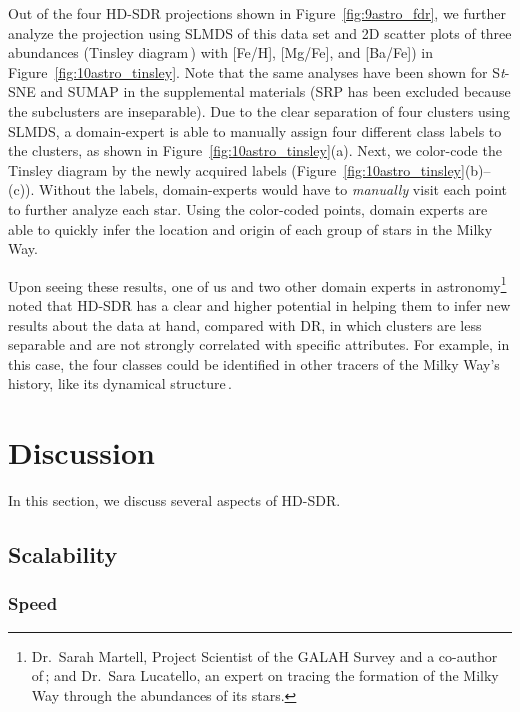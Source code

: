 \documentclass[sagev,Afour,times]{sagej}
\begin{document}
Out of the four HD-SDR projections shown in Figure~\ref{fig:9astro_fdr}, we further analyze the projection using SLMDS of this data set and 2D scatter plots of three abundances (Tinsley diagram\,\cite{Tinsley80}) with [Fe/H], [Mg/Fe], and [Ba/Fe]) in Figure~\ref{fig:10astro_tinsley}. Note that the same analyses have been shown for S\emph{t}-SNE and SUMAP in the supplemental materials (SRP has been excluded because the subclusters are inseparable). Due to the clear separation of four clusters using SLMDS, a domain-expert is able to manually assign four different class labels to the clusters, as shown in Figure~\ref{fig:10astro_tinsley}(a). Next, we color-code the Tinsley diagram by the newly acquired labels (Figure~\ref{fig:10astro_tinsley}(b)--(c)). Without the labels, domain-experts would have to \emph{manually} visit each point to further analyze each star. Using the color-coded points, domain experts are able to quickly infer the location and origin of each group of stars in the Milky Way.

Upon seeing these results, one of us and two other domain experts in astronomy\footnote{Dr.\ Sarah Martell, Project Scientist of the GALAH Survey and a co-author of\,\cite{tsne:astro2}; and Dr.\ Sara Lucatello, an expert on tracing the formation of the Milky Way through the abundances of its stars.} noted that HD-SDR has a clear and higher potential in helping them to infer new results about the data at hand, compared with DR, in which clusters are less separable and are not strongly correlated with specific attributes. For example, in this case, the four classes could be identified in other tracers of the Milky Way's history, like its dynamical structure\,\cite{Helmi20}.


\section{Discussion}
\label{sec:discussion}
In this section, we discuss several aspects of HD-SDR.


\subsection{Scalability}
\label{sec:sub:scalability:speed}
\subsubsection{Speed}
\label{sec:scal_speed}
%
\end{document}
